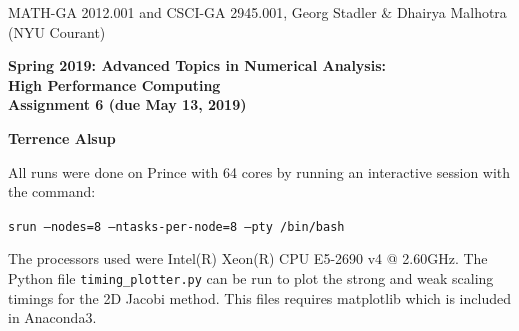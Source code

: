 \documentclass[12pt]{article}
\begin{document}
\begin{center}
  \vspace*{-2cm}
{\small MATH-GA 2012.001 and CSCI-GA 2945.001, Georg Stadler \&
  Dhairya Malhotra (NYU Courant)}
\end{center}
\vspace*{.5cm}
\begin{center}
\large \textbf{%
Spring 2019: Advanced Topics in Numerical Analysis: \\
High Performance Computing \\
Assignment 6 (due May 13, 2019) }
\end{center}

\vspace*{.5cm}
\begin{center}
\Large \textbf{Terrence Alsup}
\end{center}


\vspace{1cm}
All runs were done on Prince with 64 cores by running an interactive session with the command:\\
\begin{center}
\texttt{srun --nodes=8 --ntasks-per-node=8 --pty /bin/bash}
\end{center}
The processors used were Intel(R) Xeon(R) CPU E5-2690 v4 @ 2.60GHz.  The Python file \texttt{timing\_plotter.py} can be run to plot the strong and weak scaling timings for the 2D Jacobi method.  This files requires matplotlib which is included in Anaconda3.
\end{document}
